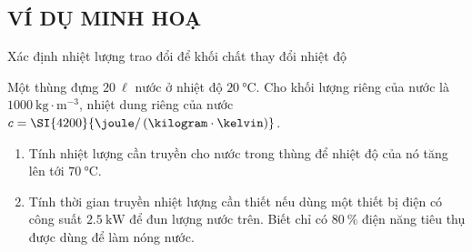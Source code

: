 \subsection{VÍ DỤ MINH HOẠ}
\begin{dang}{Xác định nhiệt lượng trao đổi để khối chất thay đổi nhiệt độ}
	\end{dang}
\begin{vd}
Một thùng đựng $\SI{20}{\ell}$ nước ở nhiệt độ $\SI{20}{\celsius}$. Cho khối lượng riêng của nước là $\SI{1000}{\kilogram\cdot\meter^{-3}}$, nhiệt dung riêng của nước $c=\SI{4200}{\joule/\left(\kilogram\cdot\kelvin\right)}$.
			\begin{enumerate}[label=\alph*)]
				\item Tính nhiệt lượng cần truyền cho nước trong thùng để nhiệt độ của nó tăng lên tới $\SI{70}{\celsius}$.
				\item Tính thời gian truyền nhiệt lượng cần thiết nếu dùng một thiết bị điện có công suất $\SI{2.5}{\kilo\watt}$ để đun lượng nước trên. Biết chỉ có $\SI{80}{\percent}$ điện năng tiêu thụ được dùng để làm nóng nước.
			\end{enumerate}
		
\end{vd}
